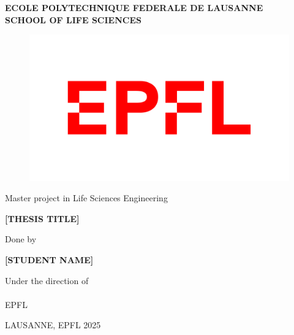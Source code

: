 \begin{titlepage}
    \centering
    \textbf{\large
    ECOLE POLYTECHNIQUE FEDERALE DE LAUSANNE\\
    SCHOOL OF LIFE SCIENCES
    }
    \vspace{0.5cm}

    \begin{figure}[h]
        \centering
        \includegraphics[width=0.5\linewidth]{figures/logo-epfl.png}
    \end{figure}

    {\Large
    Master project in Life Sciences Engineering
    }

    \vspace{2cm}

    \textbf{
    {\large [THESIS TITLE]
    }}

    \vspace{1.5cm}

    \vspace{2cm}
    Done by

    \vspace{0.5cm}
    \textbf{\Large [STUDENT NAME]}

    \vspace{1.5cm}
    Under the direction of\\
    [EPFL SUPERVISOR NAME]\\

    \vspace{1cm}
    EPFL


    \vfill
    LAUSANNE, EPFL 2025
\end{titlepage}
